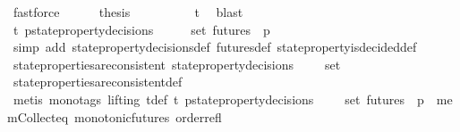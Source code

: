 \begin{isabellebody}
\ fastforce\isanewline
\ \ \ \ \isamarkupfalse%
\ {\isacharquery}thesis\isanewline
\ \ \ \ \ \ \isamarkupfalse%
\ {\isacartoucheopen}{\isasymsigma}\ {\isasymin}\ {\isasymSigma}t{\isacartoucheclose}\ \isamarkupfalse%
\ blast\isanewline
\ \ \isamarkupfalse%
\isanewline
\ \ \isamarkupfalse%
\ {\isachardoublequoteopen}{\isasymexists}{\isasymsigma}{\isasymin}{\isasymSigma}t{\isachardot}\ {\isasymforall}p{\isasymin}{\isasymUnion}{\isacharbraceleft}state{\isacharunderscore}property{\isacharunderscore}decisions\ {\isasymsigma}\ {\isacharbar}\ {\isasymsigma}{\isachardot}\ {\isasymsigma}\ {\isasymin}\ {\isasymsigma}{\isacharunderscore}set{\isacharbraceright}{\isachardot}\ {\isasymforall}{\isasymsigma}{\isacharprime}{\isasymin}futures\ {\isasymsigma}{\isachardot}\ p\ {\isasymsigma}{\isacharprime}{\isachardoublequoteclose}\isanewline
\ \ \ \ \isamarkupfalse%
\ {\isacharparenleft}simp\ add{\isacharcolon}\ state{\isacharunderscore}property{\isacharunderscore}decisions{\isacharunderscore}def\ futures{\isacharunderscore}def\ state{\isacharunderscore}property{\isacharunderscore}is{\isacharunderscore}decided{\isacharunderscore}def{\isacharparenright}\isanewline
\ \ \isamarkupfalse%
\ {\isachardoublequoteopen}state{\isacharunderscore}properties{\isacharunderscore}are{\isacharunderscore}consistent\ {\isacharparenleft}{\isasymUnion}{\isacharbraceleft}state{\isacharunderscore}property{\isacharunderscore}decisions\ {\isasymsigma}\ {\isacharbar}{\isasymsigma}{\isachardot}\ {\isasymsigma}\ {\isasymin}\ {\isasymsigma}{\isacharunderscore}set{\isacharbraceright}{\isacharparenright}{\isachardoublequoteclose}\isanewline
\ \ \ \ \isamarkupfalse%
\ state{\isacharunderscore}properties{\isacharunderscore}are{\isacharunderscore}consistent{\isacharunderscore}def\ \isanewline
\ \ \ \ \isamarkupfalse%
\ {\isacharparenleft}metis\ {\isacharparenleft}mono{\isacharunderscore}tags{\isacharcomma}\ lifting{\isacharparenright}\ {\isasymSigma}t{\isacharunderscore}def\ {\isacartoucheopen}{\isasymexists}{\isasymsigma}{\isasymin}{\isasymSigma}t{\isachardot}\ {\isasymforall}p{\isasymin}{\isasymUnion}{\isacharbraceleft}state{\isacharunderscore}property{\isacharunderscore}decisions\ {\isasymsigma}\ {\isacharbar}{\isasymsigma}{\isachardot}\ {\isasymsigma}\ {\isasymin}\ {\isasymsigma}{\isacharunderscore}set{\isacharbraceright}{\isachardot}\ {\isasymforall}{\isasymsigma}{\isacharprime}{\isasymin}futures\ {\isasymsigma}{\isachardot}\ p\ {\isasymsigma}{\isacharprime}{\isacartoucheclose}\ mem{\isacharunderscore}Collect{\isacharunderscore}eq\ monotonic{\isacharunderscore}futures\ order{\isacharunderscore}refl{\isacharparenright}\isanewline

\end{isabellebody}
